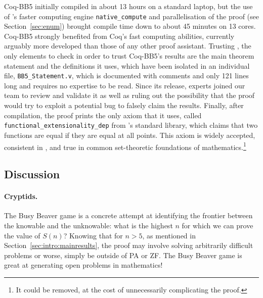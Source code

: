 \documentclass[sigconf,screen]{acmart}
\theoremstyle{definition} %
\numberwithin{equation}{section}
\theoremstyle{definition} %
\newcommand{\CoqBB}{Coq-BB5\xspace}
\begin{document}



\CoqBB initially compiled in about 13 hours on a standard laptop, but the use of \Coq's faster computing engine \texttt{native\_compute} \cite{nativecompute} and parallelisation of the proof (see Section~\ref{sec:enum}) brought compile time down to about 45 minutes on 13 cores. \CoqBB strongly benefited from Coq’s fast computing abilities, currently arguably more developed than those of any other proof assistant. Trusting \Coq, the only elements to check in order to trust \CoqBB's results are the main theorem statement and the definitions it uses, which have been isolated in an individual file, \texttt{BB5\_Statement.v}, which is documented with comments and only 121 lines long and requires no \Coq expertise to be read. Since its release, \Coq experts joined our team to review and validate it as well as ruling out the possibility that the proof would try to exploit a potential \Coq bug to falsely claim the results. Finally, after compilation, the proof prints the only axiom that it uses, called \texttt{functional\_extensionality\_dep} from \Coq's standard library, which claims that two functions are equal if they are equal at all points. This axiom is widely accepted, consistent in \Coq, and true in common set-theoretic foundations of mathematics.\footnote{It could be removed, at the cost of unnecessarily complicating the proof.}


\subsection{Discussion}\label{sec:intro:discuss}

\paragraph{Cryptids.} The Busy Beaver game is a concrete attempt at identifying the frontier between the knowable and the unknowable: what is the highest $n$ for which we can prove the value of $S(n)$? Knowing that for $n > 5$, as mentioned in Section~\ref{sec:intro:mainresults}, the proof may involve solving arbitrarily difficult problems or worse, simply be outside of PA or ZF. The Busy Beaver game is great at generating open problems in mathematics!
\end{document}
